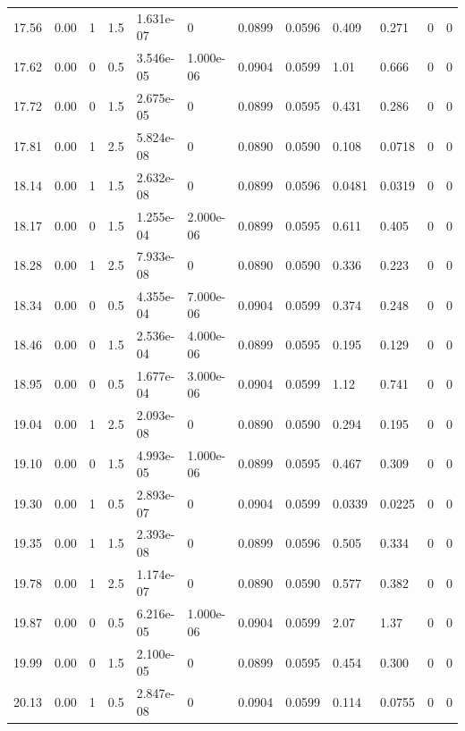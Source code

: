 \documentclass[preview]{standalone}
\begin{document}
{{{{\begin{tabular}{L{1.2cm}C{1.2cm} C{0.3cm}C{0.5cm} C{1.4cm}C{1.4cm} C{1.4cm}C{1.4cm} C{1.6cm}C{1.6cm} C{1.6cm}C{1.6cm}}
  17.56  &  0.00  & 1     & 1.5 &  1.631e-07  & 0  &  0.0899&   0.0596& 0.409 & 0.271   &  0 & 0  \\ 
  17.62  &  0.00  & 0     & 0.5 &  3.546e-05  & 1.000e-06  &  0.0904&   0.0599& 1.01 & 0.666   &  0 & 0  \\ 
  17.72  &  0.00  & 0     & 1.5 &  2.675e-05  & 0  &  0.0899&   0.0595& 0.431 & 0.286   &  0 & 0  \\ 
  17.81  &  0.00  & 1     & 2.5 &  5.824e-08  & 0  &  0.0890&   0.0590& 0.108 & 0.0718   &  0 & 0  \\ 
  18.14  &  0.00  & 1     & 1.5 &  2.632e-08  & 0  &  0.0899&   0.0596& 0.0481 & 0.0319   &  0 & 0  \\ 
  18.17  &  0.00  & 0     & 1.5 &  1.255e-04  & 2.000e-06  &  0.0899&   0.0595& 0.611 & 0.405   &  0 & 0  \\ 
  18.28  &  0.00  & 1     & 2.5 &  7.933e-08  & 0  &  0.0890&   0.0590& 0.336 & 0.223   &  0 & 0  \\ 
  18.34  &  0.00  & 0     & 0.5 &  4.355e-04  & 7.000e-06  &  0.0904&   0.0599& 0.374 & 0.248   &  0 & 0  \\ 
  18.46  &  0.00  & 0     & 1.5 &  2.536e-04  & 4.000e-06  &  0.0899&   0.0595& 0.195 & 0.129   &  0 & 0  \\ 
  18.95  &  0.00  & 0     & 0.5 &  1.677e-04  & 3.000e-06  &  0.0904&   0.0599& 1.12 & 0.741   &  0 & 0  \\ 
  19.04  &  0.00  & 1     & 2.5 &  2.093e-08  & 0  &  0.0890&   0.0590& 0.294 & 0.195   &  0 & 0  \\ 
  19.10  &  0.00  & 0     & 1.5 &  4.993e-05  & 1.000e-06  &  0.0899&   0.0595& 0.467 & 0.309   &  0 & 0  \\ 
  19.30  &  0.00  & 1     & 0.5 &  2.893e-07  & 0  &  0.0904&   0.0599& 0.0339 & 0.0225   &  0 & 0  \\ 
  19.35  &  0.00  & 1     & 1.5 &  2.393e-08  & 0  &  0.0899&   0.0596& 0.505 & 0.334   &  0 & 0  \\ 
  19.78  &  0.00  & 1     & 2.5 &  1.174e-07  & 0  &  0.0890&   0.0590& 0.577 & 0.382   &  0 & 0  \\ 
  19.87  &  0.00  & 0     & 0.5 &  6.216e-05  & 1.000e-06  &  0.0904&   0.0599& 2.07 & 1.37   &  0 & 0  \\ 
  19.99  &  0.00  & 0     & 1.5 &  2.100e-05  & 0  &  0.0899&   0.0595& 0.454 & 0.300   &  0 & 0  \\ 
  20.13  &  0.00  & 1     & 0.5 &  2.847e-08  & 0  &  0.0904&   0.0599& 0.114 & 0.0755   &  0 & 0  \\ 

\end{tabular}}}}}
\end{document}
